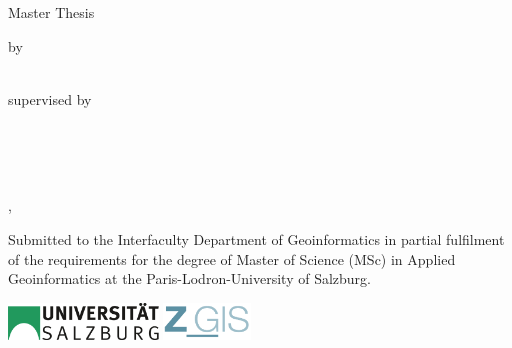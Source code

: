 %
\begin{titlepage}
    \begin{addmargin}[0cm]{-3cm} %
    \begin{center}
        \large

        \hfill

        \vfill

        \begingroup
            \color{Maroon}\spacedallcaps{\myTitle} \\ \bigskip
        \endgroup

        \spacedlowsmallcaps{\mySubtitle} \\ \medskip

        \vfill

        Master Thesis

        \vfill


        by \\
        \myName \\

        \vfill

        supervised by \\
        \mySupervisor \\
        \myOtherSupervisor \\

        \vfill

        \myDepartment \\

        \vfill

        \myLocation, \myTime\

        \vfill

    \end{center}

    \vfill

    \begin{footnotesize}
    \raggedright
    Submitted to the Interfaculty Department of Geoinformatics in partial
    fulfilment of the requirements for the degree of Master of Science (MSc)
    in Applied Geoinformatics at the Paris-Lodron-University of Salzburg.
    \end{footnotesize}

    \vfil

    \includegraphics[height=1cm]{source/figures/uni_logo.png}\hfill
    \includegraphics[height=1cm]{source/figures/zgis_logo16_new.png}\hfill

  \end{addmargin}
\end{titlepage}
